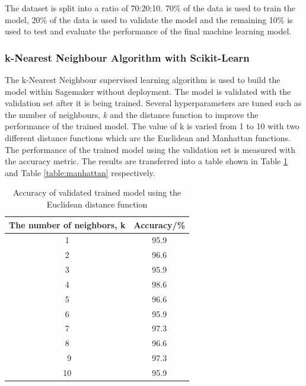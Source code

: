 The dataset is split into a ratio of 70:20:10. 70\% of the data is used to train the model, 20\% of the data is used to validate the model and the remaining 10\% is used to test and evaluate the performance of the final machine learning model. 

\subsubsection{k-Nearest Neighbour Algorithm with Scikit-Learn}
The k-Nearest Neighbour supervised learning algorithm is used to build the model within Sagemaker without deployment. The model is validated with the validation set after it is being trained. Several hyperparameters are tuned such as the number of neighbours, \textit{k} and the distance function to improve the performance of the trained model. The value of k is varied from 1 to 10 with two different distance functions which are the Euclidean and Manhattan functions. The performance of the trained model using the validation set is measured with the accuracy metric. The results are transferred into a table shown in Table \ref{table:euclidean} and Table \ref{table:manhattan} respectively.

\begin{table}[ht]
\centering
\begin{center}
\begin{tabular}{ |c|c| } 
  \hline
 The number of neighbors, k  & Accuracy/\%\\ 
  \hline\hline
1 & 95.9\\ 
2 & 96.6\\ 
3 & 95.9\\ 
4 & 98.6\\ 
5 & 96.6\\ 
6 & 95.9\\ 
7 & 97.3\\ 
8 & 96.6\\\ 
9 & 97.3\\ 
10 & 95.9\\ 
\hline
\end{tabular}
\caption{Accuracy of validated trained model using the Euclidean distance function }
\label{table:euclidean}
\end{center}
\end{table}

